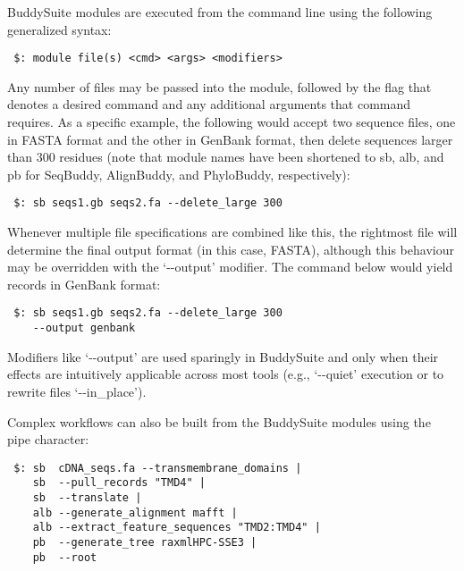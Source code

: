 \documentclass[nogrid]{MBE_article}%
\begin{document}
BuddySuite modules are executed from the command line using the following generalized syntax:

\smallskip

{\small
\begin{verbatim}
 $: module file(s) <cmd> <args> <modifiers>
\end{verbatim}
}
\smallskip

Any number of files may be passed into the module, followed by the flag that denotes a desired command and any additional arguments that command requires. As a specific example, the following would accept two sequence files, one in FASTA format and the other in GenBank format, then delete sequences larger than 300 residues (note that module names have been shortened to sb, alb, and pb for SeqBuddy, AlignBuddy, and PhyloBuddy, respectively):

\smallskip

{\small
\begin{verbatim}
 $: sb seqs1.gb seqs2.fa --delete_large 300
\end{verbatim}
}
\smallskip

Whenever multiple file specifications are combined like this, the rightmost file will determine the final output format (in this case, FASTA), although this behaviour may be overridden with the `-{}-output' modifier. The command below would yield records in GenBank format:

\smallskip

{\small
\begin{verbatim}
 $: sb seqs1.gb seqs2.fa --delete_large 300
    --output genbank
\end{verbatim}
}
\smallskip

Modifiers like \mbox{`-{}-output'} are used sparingly in BuddySuite and only when their effects are intuitively applicable across most tools (e.g., \mbox{`-{}-quiet'} execution or to rewrite files \mbox{`-{}-in\_place'}).

Complex workflows can also be built from the BuddySuite modules using the pipe character:

\smallskip
{\small
\begin{verbatim}
 $: sb  cDNA_seqs.fa --transmembrane_domains |
    sb  --pull_records "TMD4" |
    sb  --translate |
    alb --generate_alignment mafft |
    alb --extract_feature_sequences "TMD2:TMD4" |
    pb  --generate_tree raxmlHPC-SSE3 |
    pb  --root
\end{verbatim}
}

\smallskip
\end{document}

